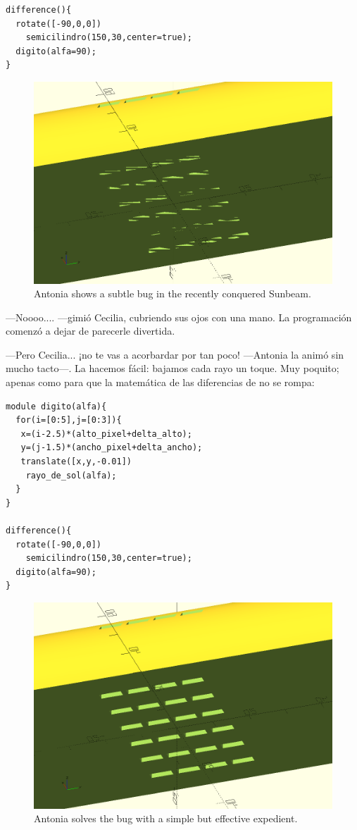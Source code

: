 \begin{lstlisting}
difference(){
  rotate([-90,0,0])
    semicilindro(150,30,center=true);  
  digito(alfa=90);
}
    \end{lstlisting}

    \begin{figure}[ht]
      \centering
      \includegraphics[width=.65\textwidth]{imagenes/digito-al-ras}
      \caption{Antonia shows a subtle bug in the recently conquered Sunbeam.}
      \label{fig:digito-al-ras}
    \end{figure}
     



    ---Noooo.... ---gimió Cecilia, cubriendo sus ojos con una mano. La
    programación comenzó a dejar de parecerle divertida.

    ---Pero Cecilia... ¡no te vas a acorbardar por tan poco!
    ---Antonia la animó sin mucho tacto---. La hacemos fácil: bajamos
    cada rayo un toque. Muy poquito; apenas como para que la
    matemática de las diferencias de \openscad{} no se rompa:

    
\begin{lstlisting}
module digito(alfa){
  for(i=[0:5],j=[0:3]){
   x=(i-2.5)*(alto_pixel+delta_alto);
   y=(j-1.5)*(ancho_pixel+delta_ancho);
   translate([x,y,-0.01])
    rayo_de_sol(alfa);
  } 
}

difference(){
  rotate([-90,0,0])
    semicilindro(150,30,center=true);  
  digito(alfa=90);
}
    \end{lstlisting}

    \begin{figure}[ht]
      \centering
      \includegraphics[width=.65\textwidth]{imagenes/digito-apenas-descendido}
      \caption{Antonia solves the bug with a simple but effective expedient.}
      \label{fig:digito-apenas-descendido}
    \end{figure}
      




